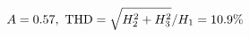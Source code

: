 \documentclass[preview]{standalone}
\begin{document}
\begin{align*}
\special{dvisvgm:raw <g id='unique000'>}A=0.57,\ \text{THD}=\sqrt{H_2^2+H_3^2}/H_1=10.9\%\special{dvisvgm:raw </g>}
\end{align*}
\end{document}
